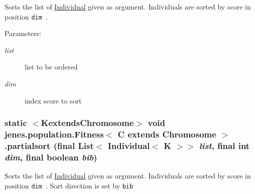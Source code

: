 Sorts the list of \hyperlink{}{Individual} given as argument. Individuals are sorted by score in position {\tt  dim }.

\begin{Desc}
\item[Parameters:]
\begin{description}
\item[{\em list}]list to be ordered \item[{\em dim}]index score to sort \end{description}
\end{Desc}
\hypertarget{classjenes_1_1population_1_1_fitness_3_01_c_01extends_01_chromosome_01_4_bb440f362a2cd5578c25d2d8dd09a33f}{
\subsubsection[partialsort]{\setlength{\rightskip}{0pt plus 5cm}static $<$KextendsChromosome$>$ void jenes.population.Fitness$<$ C extends Chromosome $>$.partialsort (final List$<$ Individual$<$ K $>$$>$ {\em list}, \/  final int {\em dim}, \/  final boolean {\em bib})}}
\label{classjenes_1_1population_1_1_fitness_3_01_c_01extends_01_chromosome_01_4_bb440f362a2cd5578c25d2d8dd09a33f}


Sorts the list of \hyperlink{}{Individual} given as argument. Individuals are sorted by score in position {\tt  dim }. Sort direction is set by {\tt  bib }

